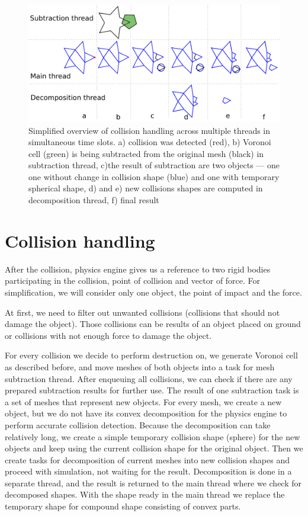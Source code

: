 \begin{figure}
        \centering
        \includegraphics[width=\textwidth]{img/object-progress}
        \caption{Simplified overview of collision handling across multiple threads in simultaneous time slots. a) collision was detected (red), b) Voronoi cell (green) is being subtracted from the original mesh (black) in subtraction thread, c)the result of subtraction are two objects --- one one without change in collision shape (blue) and one with temporary spherical shape, d) and e) new collisions shapes are computed in decomposition thread, f) final result}
        \label{fig:objectInThreads}
\end{figure}

\section{Collision handling}
\label{sec:collisions}
After the collision, physics engine gives us a reference to two rigid bodies participating in the collision, point of collision and vector of force. For simplification, we will consider only one object, the point of impact and the force.

At first, we need to filter out unwanted collisions (collisions that should not damage the object). Those collisions can be results of an object placed on ground or collisions with not enough force to damage the object. 

For every collision we decide to perform destruction on, we generate Voronoi cell as described before, and move meshes of both objects into a task for mesh subtraction thread. After enqueuing all collisions, we can check if there are any prepared subtraction results for further use. The result of one subtraction task is a set of meshes that represent new objects. For every mesh, we create a new object, but we do not have its convex decomposition for the physics engine to perform accurate collision detection. Because the decomposition can take relatively long, we create a simple temporary collision shape (\eg sphere) for the new objects and keep using the current collision shape for the original object. Then we create tasks for decomposition of current meshes into new collision shapes and proceed with simulation, not waiting for the result. Decomposition is done in a separate thread, and the result is returned to the main thread where we check for decomposed shapes. With the shape ready in the main thread we replace the temporary shape for compound shape consisting of convex parts.

